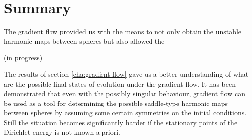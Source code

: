 \chapter{Summary}
\label{cha:summary}

The gradient flow provided us with the means to not only obtain the
unstable harmonic maps between spheres but also allowed the

(in progress)


The results of section \ref{cha:gradient-flow} gave us a
better understanding of what are the possible final states of
evolution under the gradient flow. It has been demonstrated that even
with the possibly singular behaviour, gradient flow can be used as a
tool for determining the possible saddle-type harmonic maps between
spheres by assuming some certain symmetries on the initial
conditions. Still the situation becomes significantly harder if the
stationary points of the
Dirichlet energy is not known a priori.\\



